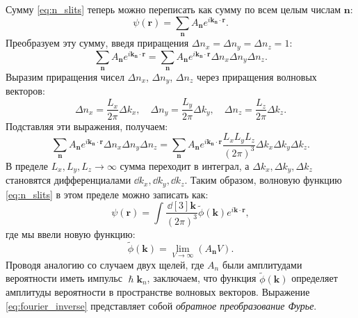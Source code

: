 \documentclass[a4paper, 12pt]{article}
\begin{document}
Сумму \eqref{eq:n_slits} теперь можно переписать как сумму по всем целым числам $\bm{n}$:
\begin{equation*}
\psi(\bm{r}) = \sum_{\bm{n}} A_{\bm{n}} e^{i \bm{k}_{\bm{n}} \cdot \bm{r}}.
\end{equation*}
Преобразуем эту сумму, введя приращения $\Delta n_x = \Delta n_y = \Delta n_z = 1$:
\begin{equation*}
\sum_{\bm{n}} A_{\bm{n}} e^{i \bm{k}_{\bm{n}} \cdot \bm{r}} = \sum_{\bm{n}} A_{\bm{n}} e^{i \bm{k}_{\bm{n}} \cdot \bm{r}} \Delta n_x \Delta n_y \Delta n_z.
\end{equation*}
Выразим приращения чисел $\Delta n_x$, $\Delta n_y$, $\Delta n_z$ через приращения волновых векторов:
\begin{equation*}
\Delta n_x = \frac{L_x}{2\pi} \Delta k_x, \quad \Delta n_y = \frac{L_y}{2\pi} \Delta k_y, \quad \Delta n_z = \frac{L_z}{2\pi} \Delta k_z.
\end{equation*}
Подставляя эти выражения, получаем:
\begin{equation*}
\sum_{\bm{n}} A_{\bm{n}} e^{i \bm{k}_{\bm{n}} \cdot \bm{r}} \Delta n_x \Delta n_y \Delta n_z = \sum_{\bm{n}} A_{\bm{n}} e^{i \bm{k}_{\bm{n}} \cdot \bm{r}} \frac{L_x L_y L_z}{(2\pi)^3} \Delta k_x \Delta k_y \Delta k_z.
\end{equation*}
В пределе $L_x, L_y, L_z \to \infty$ сумма переходит в интеграл, а $\Delta k_x, \Delta k_y, \Delta k_z$ становятся дифференциалами $\dd k_x, \dd k_y, \dd k_z$. Таким образом, волновую функцию \eqref{eq:n_slits} в этом пределе можно записать как:
\begin{equation}
\psi(\bm{r}) = \int \frac{\dd[3]{\bm{k}}}{(2\pi)^3}\tilde{\phi}(\bm{k}) e^{i \bm{k} \cdot \bm{r}},
\label{eq:fourier_inverse}
\end{equation}
где мы ввели новую функцию:
\begin{equation*}
\tilde{\phi}(\bm{k}) = \lim_{V \to \infty} (A_{\bm{n}} V).
\end{equation*}
Проводя аналогию со случаем двух щелей, где $A_n$ были амплитудами вероятности иметь импульс $\hslash \bm{k}_n$, заключаем, что функция $\tilde{\phi}(\bm{k})$ определяет амплитуды вероятности в пространстве волновых векторов. Выражение \eqref{eq:fourier_inverse} представляет собой \textit{обратное преобразование Фурье}.
\end{document}
